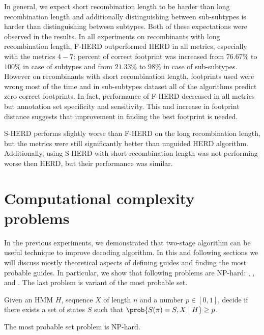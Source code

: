 In general, we expect short recombination length to be harder than long
recombination length and additionally distinguishing between sub-subtypes is
harder than distinguishing between subtypes. Both of these expectations were
observed in the results. In all experiments on recombinants with long
recombination length, F-HERD outperformed HERD in all metrics, especially with
the metrics $4-7$: percent of correct footprint was increased from $76.67\%$ to
$100\%$ in case of subtypes and from $21.33\%$ to $98\%$ in case of
sub-subtypes. However on recombinants with short recombination length,
footprints used were wrong most of the time and in sub-subtypes dataset all of
the algorithms predict zero correct footprints.  In fact, performance of F-HERD
decreased in all metrics but annotation set specificity and sensitivity. This
and increase in footprint distance suggests that improvement in finding the best
footprint is needed.


S-HERD performs slightly worse than F-HERD on the long recombination length, but
the metrics were still significantly better than unguided HERD algorithm.
Additionally, using S-HERD with short recombination length was not performing
worse then HERD, but their performance was similar.

\section{Computational complexity problems}

In the previous experiments, we demonstrated that two-stage algorithm can be
useful technique to improve decoding algorithm. In this and following sections
we will discuss mostly theoretical aspects of defining guides and finding the
most probable guides. In particular, we show that following problems are
NP-hard: ,
, and . The last problem is variant of the most probable set.


\begin{definition} Given an HMM $H$, sequence $X$ of
length $n$ and a number $p\in [0,1]$, decide if there exists a set of states $S$
such that $\prob{S(\pi) = S, X\mid H} \geq p$.
\end{definition}

\begin{theorem}
The most probable set problem is NP-hard. \label{THEOREM::NPSET}
\end{theorem}


